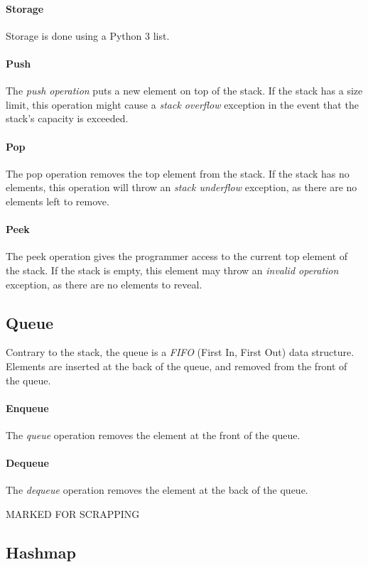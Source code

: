 \documentclass{article}
\begin{document}
\paragraph{Storage}
Storage is done using a Python 3 list.

\paragraph{Push}
The {\em push operation} puts a new element on top of the stack.
If the stack has a size limit, this operation might cause a {\em stack overflow} exception in the event that the stack's capacity is exceeded.

\paragraph{Pop}
The pop operation removes the top element from the stack. If the stack has no elements, this operation will throw an {\em stack underflow} exception,
as there are no elements left to remove.

\paragraph{Peek}
The peek operation gives the programmer access to the current top element of the stack.
If the stack is empty, this element may throw an {\em invalid operation} exception, as there are no elements to reveal.


\subsection{Queue}
Contrary to the stack, the queue is a {\em FIFO} (First In, First Out) data structure.
Elements are inserted at the back of the queue, and removed from the front of the queue.

\paragraph{Enqueue}
The {\em queue} operation removes the element at the front of the queue.


\paragraph{Dequeue}
The {\em dequeue} operation removes the element at the back of the queue.

\newpage

\huge MARKED FOR SCRAPPING
\subsection{Hashmap}
\end{document}
